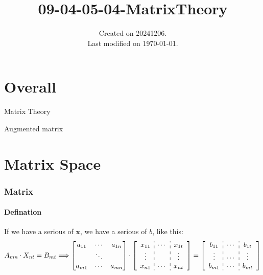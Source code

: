 \documentclass[UTF8]{../../09-Mathematics}
\begin{document}
\title{09-04-05-04-MatrixTheory}
\date{Created on 20241206.\\   Last modified on \today.}
\maketitle
\tableofcontents


\chapter{Overall}

Matrix Theory



Augmented matrix



\chapter{Matrix Space}

\subsection{Matrix}


\subsubsection{Defination}

If we have a serious of $\boldsymbol x$, we have a serious of $b$, like this:
\begin{equation}
  A_{mn} \cdot X_{nt} = B_{mt}
  \Longrightarrow
  \begin{bmatrix}
     a_{11} & \cdots & a_{1n}\\
     & \ddots & \\
     a_{m1} & \cdots & a_{mn} \\
  \end{bmatrix}
  \cdot
  \left[
    \begin{array}{c:c:c}
      x_{11} & \cdots & x_{1t}\\
     \vdots&  & \vdots \\
     x_{n1} & \cdots & x_{nt} \\
    \end{array}
 \right] 
  =
 \left[
    \begin{array}{c:c:c}
      b_{11} & \cdots & b_{1t}\\
      \vdots& \cdots & \vdots \\
      b_{m1} & \cdots & b_{mt} \\
    \end{array}
 \right] 
\end{equation}
\end{document}

